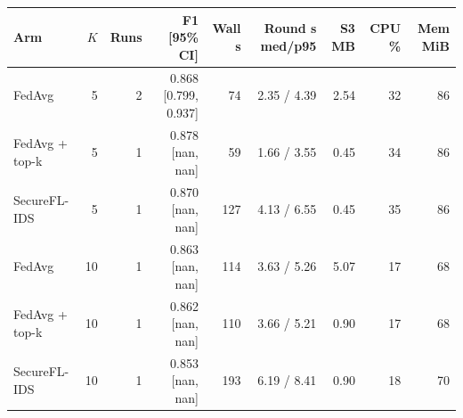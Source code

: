 \begin{tabular}{lrrrrrrrr}
\toprule
Arm & $K$ & Runs & F1 [95\% CI] & Wall s & Round s med/p95 & S3 MB & CPU \% & Mem MiB \\
\midrule
FedAvg & 5 & 2 & 0.868 [0.799, 0.937] & 74 & 2.35 / 4.39 & 2.54 & 32 & 86 \\
FedAvg + top-k & 5 & 1 & 0.878 [nan, nan] & 59 & 1.66 / 3.55 & 0.45 & 34 & 86 \\
SecureFL-IDS & 5 & 1 & 0.870 [nan, nan] & 127 & 4.13 / 6.55 & 0.45 & 35 & 86 \\
FedAvg & 10 & 1 & 0.863 [nan, nan] & 114 & 3.63 / 5.26 & 5.07 & 17 & 68 \\
FedAvg + top-k & 10 & 1 & 0.862 [nan, nan] & 110 & 3.66 / 5.21 & 0.90 & 17 & 68 \\
SecureFL-IDS & 10 & 1 & 0.853 [nan, nan] & 193 & 6.19 / 8.41 & 0.90 & 18 & 70 \\
\bottomrule
\end{tabular}
